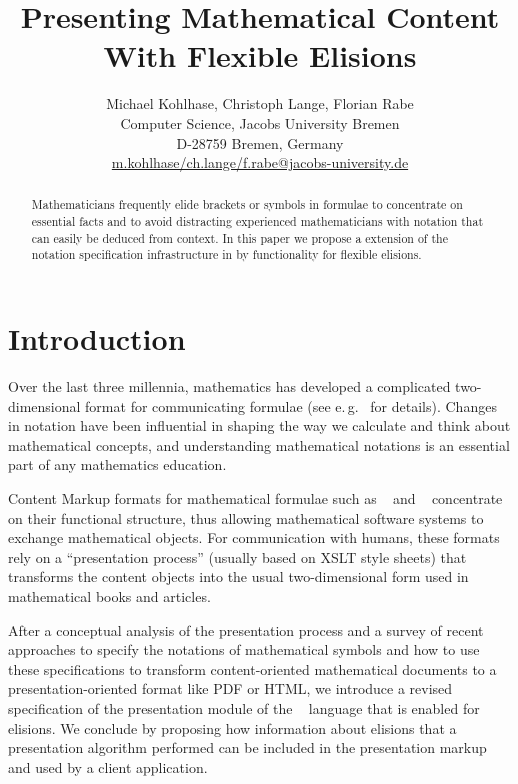 \documentclass[a4paper]{article}
\title{Presenting Mathematical Content With Flexible Elisions}
\author{Michael Kohlhase, Christoph Lange, Florian Rabe\\ 
  Computer Science, Jacobs University Bremen\\
  D-28759 Bremen, Germany \\ 
  {\small\url{m.kohlhase/ch.lange/f.rabe@jacobs-university.de}}}
\date{}
\begin{document}
\maketitle

\begin{abstract}%
  Mathematicians frequently elide brackets or symbols in formulae to concentrate on
  essential facts and to avoid distracting experienced mathematicians with notation that
  can easily be deduced from context. In this paper we propose a extension of the notation
  specification infrastructure in {\omdoc} by functionality for flexible elisions.
\end{abstract}

\section{Introduction}\label{sec:intro} 

Over the last three millennia, mathematics has developed a complicated two-dimensional
format for communicating formulae (see e.\,g.~\cite{Cajori:ahmn93,Wolfram:mnpf00} for
details). Changes in notation have been influential in shaping the way we calculate and
think about mathematical concepts, and understanding mathematical notations is an
essential part of any mathematics education.

Content Markup formats for mathematical formulae such as
{\openmath}~\cite{BusCapCar:2oms04} and {\mathml}~\cite{CarIon:MathML03} concentrate on
their functional structure, thus allowing mathematical software systems to exchange
mathematical objects. For communication with humans, these formats rely on a
``presentation process'' (usually based on XSLT style sheets) that transforms the content
objects into the usual two-dimensional form used in mathematical books and articles.

After a conceptual analysis of the presentation process and a survey of recent approaches
to specify the notations of mathematical symbols and how to use these specifications to
transform content-oriented mathematical documents to a presentation-oriented format like
PDF or HTML, we introduce a revised specification of the presentation module of the
{\omdoc}~\cite{Kohlhase:omdoc1.2} language that is enabled for elisions.  We conclude by
proposing how information about elisions that a presentation algorithm performed can be
included in the presentation markup and used by a client application.
\end{document}
